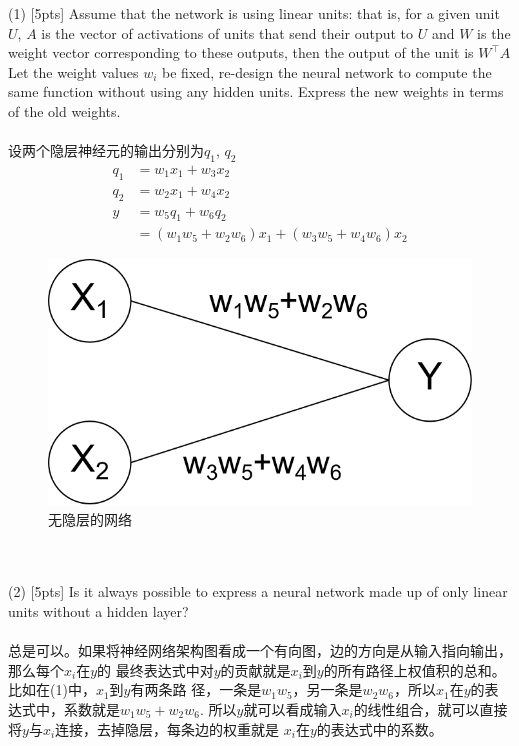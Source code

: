 \documentclass{article}
\begin{document}
	(1) [5pts] Assume that the network is using linear units: that is, for a given unit $U$, $A$ is the vector of activations of units that send their output to $U$ and $W$ is the weight vector corresponding to these outputs, then the output of the unit is $W^{\top}A$ Let the weight values $w_i$ be fixed, re-design the neural network to compute the same function without using any hidden units. Express the new weights in terms of the old weights.
    \\\\
    设两个隐层神经元的输出分别为$q_1$, $q_2$
    \begin{equation}
        \begin{aligned}
            q_1 &= w_1 x_1 + w_3 x_2\\
            q_2 &= w_2 x_1 + w_4 x_2\\
            y   &= w_5 q_1 + w_6 q_2\\
                &= (w_1 w_5 + w_2 w_6)x_1 + (w_3 w_5 + w_4 w_6)x_2
        \end{aligned}
    \end{equation}
    \begin{figure}
        \centering
        \includegraphics[width=.7\textwidth]{T2_network_without_hidden_layer.png}
        \caption{无隐层的网络}
    \end{figure}
    \\\\
	(2) [5pts] Is it always possible to express a neural network made up of only linear units without a hidden layer?
    \\\\
    总是可以。如果将神经网络架构图看成一个有向图，边的方向是从输入指向输出，那么每个$x_i$在$y$的
    最终表达式中对$y$的贡献就是$x_i$到$y$的所有路径上权值积的总和。比如在(1)中，$x_1$到$y$有两条路
    径，一条是$w_1 w_5$，另一条是$w_2 w_6$，所以$x_1$在$y$的表达式中，系数就是$w_1 w_5 + w_2 w_6$.
    所以$y$就可以看成输入$x_i$的线性组合，就可以直接将$y$与$x_i$连接，去掉隐层，每条边的权重就是
    $x_i$在$y$的表达式中的系数。
    \\\\
\end{document}
